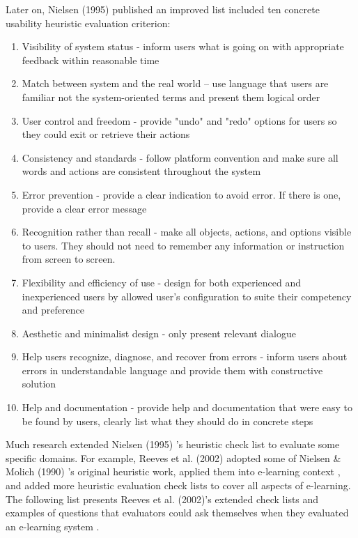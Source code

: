 Later on, Nielsen (1995) \cite{nielsen199510} published an improved list included ten concrete usability heuristic evaluation criterion: 
\begin{enumerate}
\item Visibility of system status - inform users what is going on with appropriate feedback within reasonable time
\item Match between system and the real world – use language that users are familiar not the system-oriented terms and present them logical order 
\item User control and freedom - provide "undo" and "redo" options for users so they could exit or retrieve their actions 
\item Consistency and standards - follow platform convention and make sure all words and actions are consistent throughout the system 
\item Error prevention - provide a clear indication to avoid error. If there is one, provide a clear error message 
\item Recognition rather than recall - make all objects, actions, and options visible to users. They should not need to remember any information or instruction from screen to screen. 
\item Flexibility and efficiency of use - design for both experienced and inexperienced users by allowed user's configuration to suite their competency and preference 
\item Aesthetic and minimalist design - only present relevant dialogue 
\item Help users recognize, diagnose, and recover from errors - inform users about errors in understandable language and provide them with constructive solution
\item Help and documentation - provide help and documentation that were easy to be found by users, clearly list what they should do in concrete steps
\end{enumerate} 

Much research extended Nielsen (1995) \cite{nielsen199510}'s heuristic check list to evaluate some specific domains. For example, Reeves et al. (2002) \cite{reeves2002usability} adopted some of Nielsen \& Molich (1990) \cite{nielsen199510}'s original heuristic work, applied them into e-learning context , and added more heuristic evaluation check lists to cover all aspects of e-learning. The following list presents Reeves et al. (2002)'s extended check lists and examples of questions that evaluators could ask themselves when they evaluated an e-learning system \cite[pp.4-6]{reeves2002usability}.

